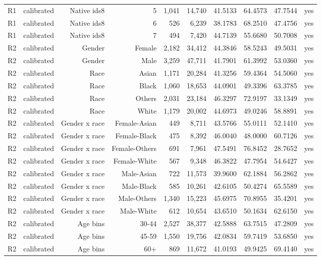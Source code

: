 \documentclass[10pt]{article}
\begin{document}
\begin{longtable}{@{}lrrrrrrrrr@{}}
R1 & calibrated & Native ids8 & 5 & 1,041 & 14,740 & 41.5133 & 64.4573 & 47.7544 & yes \\
R1 & calibrated & Native ids8 & 6 & 526 & 6,239 & 38.1783 & 68.2510 & 47.4756 & yes \\
R1 & calibrated & Native ids8 & 7 & 494 & 7,420 & 44.7139 & 55.6680 & 50.7008 & yes \\
R2 & calibrated & Gender & Female & 2,182 & 34,412 & 44.3846 & 58.5243 & 49.5031 & yes \\
R2 & calibrated & Gender & Male & 3,259 & 47,711 & 41.7901 & 61.3992 & 53.0360 & yes \\
R2 & calibrated & Race & Asian & 1,171 & 20,284 & 41.3256 & 59.4364 & 54.5060 & yes \\
R2 & calibrated & Race & Black & 1,060 & 18,653 & 44.0901 & 49.3396 & 63.3785 & yes \\
R2 & calibrated & Race & Others & 2,031 & 23,184 & 46.3297 & 72.9197 & 33.1349 & yes \\
R2 & calibrated & Race & White & 1,179 & 20,002 & 44.6973 & 49.0246 & 58.8891 & yes \\
R2 & calibrated & Gender x race & Female-Asian & 449 & 8,711 & 43.5766 & 55.0111 & 52.1410 & yes \\
R2 & calibrated & Gender x race & Female-Black & 475 & 8,392 & 46.0040 & 48.0000 & 60.7126 & yes \\
R2 & calibrated & Gender x race & Female-Others & 691 & 7,961 & 47.5491 & 76.8452 & 28.7652 & yes \\
R2 & calibrated & Gender x race & Female-White & 567 & 9,348 & 46.3822 & 47.7954 & 54.6427 & yes \\
R2 & calibrated & Gender x race & Male-Asian & 722 & 11,573 & 39.9600 & 62.1884 & 56.2862 & yes \\
R2 & calibrated & Gender x race & Male-Black & 585 & 10,261 & 42.6105 & 50.4274 & 65.5589 & yes \\
R2 & calibrated & Gender x race & Male-Others & 1,340 & 15,223 & 45.6975 & 70.8955 & 35.4201 & yes \\
R2 & calibrated & Gender x race & Male-White & 612 & 10,654 & 43.6510 & 50.1634 & 62.6150 & yes \\
R2 & calibrated & Age bins & 30-44 & 2,527 & 38,377 & 42.5888 & 63.7515 & 47.2809 & yes \\
R2 & calibrated & Age bins & 45-59 & 1,550 & 19,756 & 42.0834 & 59.7419 & 53.6850 & yes \\
R2 & calibrated & Age bins & 60+ & 869 & 11,672 & 41.0193 & 49.9425 & 69.4140 & yes \\

\end{longtable}
\end{document}
